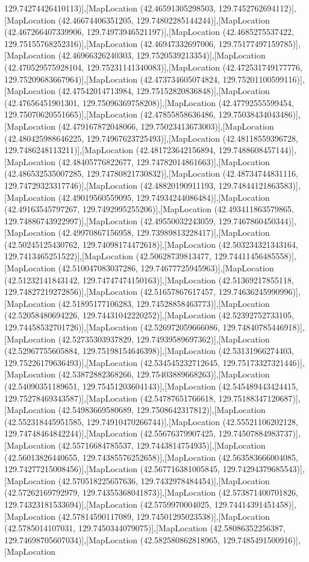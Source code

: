 129.74274426410113)],[MapLocation (42.46591305298503, 129.7452762694112)],[MapLocation (42.46674406351205, 129.74802285144244)],[MapLocation (42.467266407339906, 129.74973946521197)],[MapLocation (42.4685275537422, 129.75155768252316)],[MapLocation (42.46947332697006, 129.75177497159785)],[MapLocation (42.46966326240303, 129.7520539213354)],[MapLocation (42.470529575928104, 129.75231141340083)],[MapLocation (42.472531749177776, 129.75209683667964)],[MapLocation (42.473734605074824, 129.75201100599116)],[MapLocation (42.47542014713984, 129.75152820836848)],[MapLocation (42.47656451901301, 129.75096369758208)],[MapLocation (42.47792555599454, 129.75070620551665)],[MapLocation (42.47855858636486, 129.75038434043486)],[MapLocation (42.479167872048066, 129.75023413673003)],[MapLocation (42.480425988646225, 129.74967623725493)],[MapLocation (42.48118559396728, 129.7486248113211)],[MapLocation (42.481723642156894, 129.7488608457144)],[MapLocation (42.48405776822677, 129.74782014861663)],[MapLocation (42.486532535007285, 129.74780821730832)],[MapLocation (42.48734744831116, 129.74729323317746)],[MapLocation (42.48820190911193, 129.74844121863583)],[MapLocation (42.49019560559095, 129.74934244086484)],[MapLocation (42.49163545797267, 129.7492995255206)],[MapLocation (42.493411863579865, 129.74886743922997)],[MapLocation (42.49550032243059, 129.7467860450344)],[MapLocation (42.49970867156958, 129.73989813228417)],[MapLocation (42.50245125430762, 129.74098174472618)],[MapLocation (42.503234321343164, 129.7413465251522)],[MapLocation (42.50628739813477, 129.74411456485558)],[MapLocation (42.510047083037286, 129.74677725945963)],[MapLocation (42.51232141843142, 129.74747474150163)],[MapLocation (42.51369217855118, 129.74827219272856)],[MapLocation (42.51657867617457, 129.74636245990996)],[MapLocation (42.51895177106283, 129.74528858463773)],[MapLocation (42.52058480694226, 129.74431042220252)],[MapLocation (42.52392752733105, 129.74458532701726)],[MapLocation (42.526972059666086, 129.74840785446918)],[MapLocation (42.52735303937829, 129.74939589697362)],[MapLocation (42.52967755605884, 129.75198154646398)],[MapLocation (42.53131966274403, 129.75226179636493)],[MapLocation (42.534545232712645, 129.75173327321446)],[MapLocation (42.53872882368266, 129.75403889668263)],[MapLocation (42.54090351189651, 129.75451203604143)],[MapLocation (42.545489443424415, 129.75278469343587)],[MapLocation (42.54787651766618, 129.75188347120687)],[MapLocation (42.54983669580689, 129.7508642317812)],[MapLocation (42.552318445951585, 129.74910470266744)],[MapLocation (42.55521106202128, 129.74748464842244)],[MapLocation (42.55676379907425, 129.74507884983737)],[MapLocation (42.55716684785537, 129.7443814754935)],[MapLocation (42.56013826440655, 129.74385576252658)],[MapLocation (42.563583666004085, 129.74277215008456)],[MapLocation (42.567716381005845, 129.74294379685543)],[MapLocation (42.570518225657636, 129.7432978484454)],[MapLocation (42.57262169792979, 129.74355368041873)],[MapLocation (42.573871400701826, 129.74323181533694)],[MapLocation (42.5759970004025, 129.74414391451458)],[MapLocation (42.57814590117089, 129.74501295023538)],[MapLocation (42.5785014107031, 129.7450344079075)],[MapLocation (42.58086352256387, 129.74698705607034)],[MapLocation (42.582580862818965, 129.7485491500916)],[MapLocation 